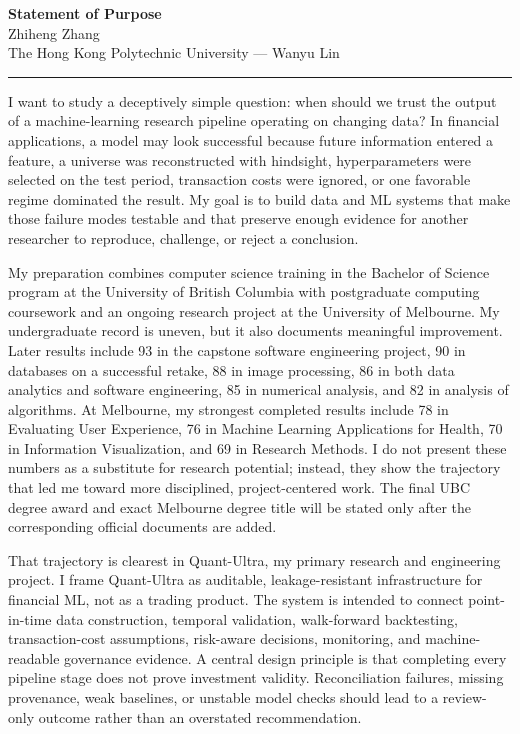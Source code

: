 \documentclass[11pt]{article}
\newcommand{\ApplicantName}{Zhiheng Zhang}
\begin{document}
\begin{center}
{\LARGE\bfseries Statement of Purpose}\\[0.25em]
{\large \ApplicantName}\\
The Hong Kong Polytechnic University --- Wanyu Lin
\end{center}
\vspace{0.35em}\hrule\vspace{0.65em}

I want to study a deceptively simple question: when should we trust the output of a machine-learning research pipeline operating on changing data? In financial applications, a model may look successful because future information entered a feature, a universe was reconstructed with hindsight, hyperparameters were selected on the test period, transaction costs were ignored, or one favorable regime dominated the result. My goal is to build data and ML systems that make those failure modes testable and that preserve enough evidence for another researcher to reproduce, challenge, or reject a conclusion.

My preparation combines computer science training in the Bachelor of Science program at the University of British Columbia with postgraduate computing coursework and an ongoing research project at the University of Melbourne. My undergraduate record is uneven, but it also documents meaningful improvement. Later results include 93 in the capstone software engineering project, 90 in databases on a successful retake, 88 in image processing, 86 in both data analytics and software engineering, 85 in numerical analysis, and 82 in analysis of algorithms. At Melbourne, my strongest completed results include 78 in Evaluating User Experience, 76 in Machine Learning Applications for Health, 70 in Information Visualization, and 69 in Research Methods. I do not present these numbers as a substitute for research potential; instead, they show the trajectory that led me toward more disciplined, project-centered work. The final UBC degree award and exact Melbourne degree title will be stated only after the corresponding official documents are added.

That trajectory is clearest in Quant-Ultra, my primary research and engineering project. I frame Quant-Ultra as auditable, leakage-resistant infrastructure for financial ML, not as a trading product. The system is intended to connect point-in-time data construction, temporal validation, walk-forward backtesting, transaction-cost assumptions, risk-aware decisions, monitoring, and machine-readable governance evidence. A central design principle is that completing every pipeline stage does not prove investment validity. Reconciliation failures, missing provenance, weak baselines, or unstable model checks should lead to a review-only outcome rather than an overstated recommendation.
\end{document}
